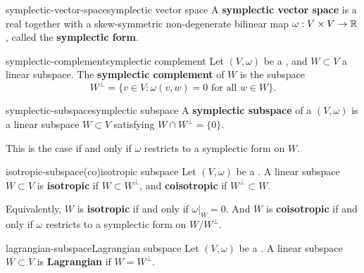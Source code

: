 \begin{topic}{symplectic-vector-space}{symplectic vector space}
    A \textbf{symplectic vector space} is a real  together with a skew-symmetric non-degenerate bilinear map $\omega : V \times V \to \mathbb{R}$, called the \textbf{symplectic form}.
\end{topic}

\begin{topic}{symplectic-complement}{symplectic complement}
    Let $(V, \omega)$ be a , and $W \subset V$ a linear subspace. The \textbf{symplectic complement} of $W$ is the subspace
    \[ W^\perp = \{ v \in V : \omega(v, w) = 0 \text{ for all } w \in W \} . \]
\end{topic}

\begin{topic}{symplectic-subspace}{symplectic subspace}
    A \textbf{symplectic subspace} of a  $(V, \omega)$ is a linear subspace $W \subset V$ satisfying $W \cap W^\perp = \{ 0 \}$.
    
    This is the case if and only if $\omega$ restricts to a symplectic form on $W$.
\end{topic}

\begin{topic}{isotropic-subspace}{(co)isotropic subspace}
    Let $(V, \omega)$ be a . A linear subspace $W \subset V$ is \textbf{isotropic} if $W \subset W^\perp$, and \textbf{coisotropic} if $W^\perp \subset W$.
    
    Equivalently, $W$ is \textbf{isotropic} if and only if $\omega|_W = 0$. And $W$ is \textbf{coisotropic} if and only if $\omega$ restricts to a symplectic form on $W/W^\perp$.
\end{topic}

\begin{topic}{lagrangian-subspace}{Lagrangian subspace}
    Let $(V, \omega)$ be a . A linear subspace $W \subset V$ is \textbf{Lagrangian} if $W = W^\perp$.
\end{topic}
